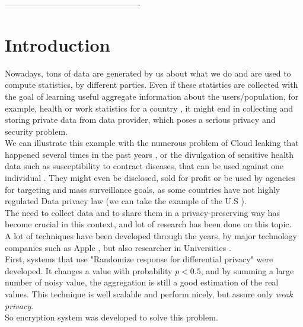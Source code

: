 \documentclass{article}
\begin{document}
-------------------------------------------------

\newpage
\tableofcontents
\newpage



\section*{Introduction}
Nowadays, tons of data are generated by us about what we do and are used to compute statistics, by different parties. Even if these statistics are collected with the goal of learning useful aggregate information about the users/population, for example, health or work statistics for a country \cite{swiss}, it might end in collecting and storing private data from data provider, which poses a serious privacy and security problem.\\
We can illustrate this example with the numerous problem of Cloud leaking that happened several times in the past years \cite{pentagon}, or the divulgation of sensitive health data such as susceptibility to contract diseases, that can be used against one individual \cite{sell}. They might even be disclosed, sold for profit \cite{sold} or be used by agencies for targeting and mass surveillance goals, as some countries have not highly regulated Data privacy law (we can take the example of the U.S \cite{law}).\\
The need to collect data and to share them in a privacy-preserving way has become crucial in this context, and lot of research has been done on this topic.\\
A lot of techniques have been developed through the years, by major technology companies such as Apple \cite{apple}, but also researcher in Universities \cite{unlynx,prio}.\\
First, systems that use "Randomize response for differential privacy" \cite{randomized} were developed. It changes a value with probability $p < 0.5$, and by summing a large number of noisy value, the aggregation is still a good estimation of the real values. This technique is well scalable and perform nicely, but assure only \textit{weak privacy}.\\
So encryption system was developed to solve this problem.
\end{document}

